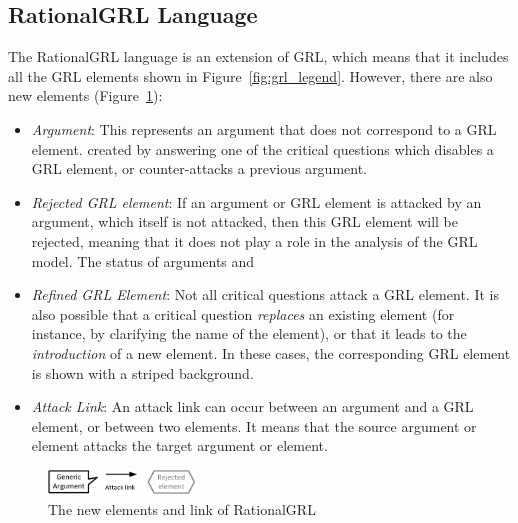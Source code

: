 \subsection{RationalGRL Language}
The RationalGRL language is an extension of GRL, which means that it includes all the GRL elements shown in Figure~\ref{fig:grl_legend}. However, there are also new elements (Figure~\ref{fig:rationalgrllegend}):

\begin{itemize}
\item \emph{Argument}: This represents an argument that does not correspond to a GRL element. created by answering one of the critical questions which disables a GRL element, or counter-attacks a previous argument. 
\item \emph{Rejected GRL element}: If an argument or GRL element is attacked by an argument, which itself is not attacked, then this GRL element will be rejected, meaning that it does not play a role in the analysis of the GRL model. The status of arguments and 
\item \emph{Refined GRL Element}: Not all critical questions attack a GRL element. It is also possible that a critical question \emph{replaces} an existing element (for instance, by clarifying the name of the element), or that it leads to the \emph{introduction} of a new element. In these cases, the corresponding GRL element is shown with a striped background. 
\item \emph{Attack Link}: An attack link can occur between an argument and a GRL element, or between two elements. It means that the source argument or element attacks the target argument or element.
\end{itemize} 

\begin{figure}[h]
\centering
\includegraphics[width=0.35\textwidth]{img/legend}
\caption{The new elements and link of RationalGRL}
\label{fig:rationalgrllegend}
\end{figure}
\fi%

